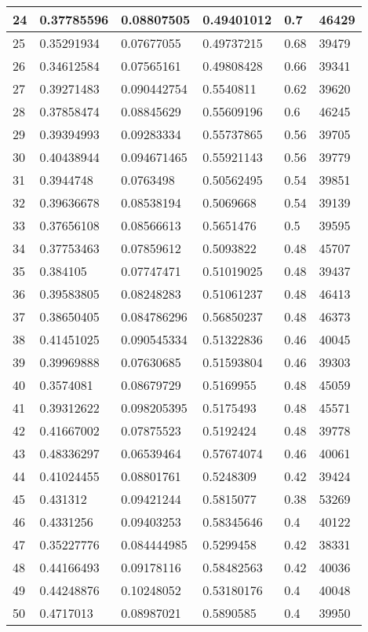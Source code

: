 \begin{longtable}{|l|l|l|l|l|l|}
24 & 0.37785596 & 0.08807505 & 0.49401012 & 0.7 & 46429 \\ \hline 
25 & 0.35291934 & 0.07677055 & 0.49737215 & 0.68 & 39479 \\ \hline 
26 & 0.34612584 & 0.07565161 & 0.49808428 & 0.66 & 39341 \\ \hline 
27 & 0.39271483 & 0.090442754 & 0.5540811 & 0.62 & 39620 \\ \hline 
28 & 0.37858474 & 0.08845629 & 0.55609196 & 0.6 & 46245 \\ \hline 
29 & 0.39394993 & 0.09283334 & 0.55737865 & 0.56 & 39705 \\ \hline 
30 & 0.40438944 & 0.094671465 & 0.55921143 & 0.56 & 39779 \\ \hline 
31 & 0.3944748 & 0.0763498 & 0.50562495 & 0.54 & 39851 \\ \hline 
32 & 0.39636678 & 0.08538194 & 0.5069668 & 0.54 & 39139 \\ \hline 
33 & 0.37656108 & 0.08566613 & 0.5651476 & 0.5 & 39595 \\ \hline 
34 & 0.37753463 & 0.07859612 & 0.5093822 & 0.48 & 45707 \\ \hline 
35 & 0.384105 & 0.07747471 & 0.51019025 & 0.48 & 39437 \\ \hline 
36 & 0.39583805 & 0.08248283 & 0.51061237 & 0.48 & 46413 \\ \hline 
37 & 0.38650405 & 0.084786296 & 0.56850237 & 0.48 & 46373 \\ \hline 
38 & 0.41451025 & 0.090545334 & 0.51322836 & 0.46 & 40045 \\ \hline 
39 & 0.39969888 & 0.07630685 & 0.51593804 & 0.46 & 39303 \\ \hline 
40 & 0.3574081 & 0.08679729 & 0.5169955 & 0.48 & 45059 \\ \hline 
41 & 0.39312622 & 0.098205395 & 0.5175493 & 0.48 & 45571 \\ \hline 
42 & 0.41667002 & 0.07875523 & 0.5192424 & 0.48 & 39778 \\ \hline 
43 & 0.48336297 & 0.06539464 & 0.57674074 & 0.46 & 40061 \\ \hline 
44 & 0.41024455 & 0.08801761 & 0.5248309 & 0.42 & 39424 \\ \hline 
45 & 0.431312 & 0.09421244 & 0.5815077 & 0.38 & 53269 \\ \hline 
46 & 0.4331256 & 0.09403253 & 0.58345646 & 0.4 & 40122 \\ \hline 
47 & 0.35227776 & 0.084444985 & 0.5299458 & 0.42 & 38331 \\ \hline 
48 & 0.44166493 & 0.09178116 & 0.58482563 & 0.42 & 40036 \\ \hline 
49 & 0.44248876 & 0.10248052 & 0.53180176 & 0.4 & 40048 \\ \hline 
50 & 0.4717013 & 0.08987021 & 0.5890585 & 0.4 & 39950 \\ \hline 
\end{longtable}